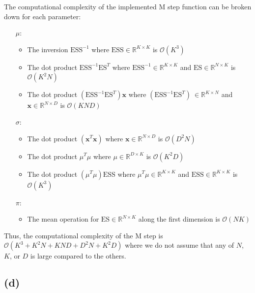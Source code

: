 \documentclass[12pt]{article}
\begin{document}
The computational complexity of the implemented M step function can be broken down for each parameter:

\begin{itemize}
\item [$\mu$:]\begin{itemize}
\item The inversion $\text{ESS}^{-1}$ where $\text{ESS} \in \mathbb{R}^{K \times K}$ is $\mathcal{O}(K^3)$
\item The dot product $\text{ESS}^{-1} \text{ES}^T$ where $\text{ESS}^{-1} \in \mathbb{R}^{K \times K}$ and $\text{ES} \in \mathbb{R}^{N \times K}$ is  $\mathcal{O}(K^2N)$
\item The dot product $(\text{ESS}^{-1} \text{ES}^T)\textbf{x}$ where $(\text{ESS}^{-1} \text{ES}^T)\ \in \mathbb{R}^{K \times N}$ and $\textbf{x} \in \mathbb{R}^{N \times D}$ is  $\mathcal{O}(KND )$
\end{itemize}

\item [$\sigma$:] \begin{itemize}
\item The dot product $(\textbf{x}^{T} \textbf{x})$ where $\textbf{x} \in \mathbb{R}^{N \times D}$ is  $\mathcal{O}(D^2N)$
\item The dot product $\mu^{T} \mu$ where $\mu \in \mathbb{R}^{D \times K}$ is  $\mathcal{O}(K^2D)$
\item The dot product $(\mu^{T} \mu)\text{ESS}$ where $\mu^{T} \mu \in \mathbb{R}^{K \times K}$ and $\text{ESS} \in \mathbb{R}^{K \times K}$ is $\mathcal{O}(K^3)$
\end{itemize}
\item [$\pi$:] \begin{itemize}
    \item The mean operation for $\text{ES} \in \mathbb{R}^{N \times K}$ along the first dimension is $\mathcal{O}(NK)$
    \end{itemize}
\end{itemize}

Thus, the computational complexity of the M step is $\mathcal{O}(K^3+K^2N + KND + D^2N + K^2D)$ where we do not assume that any of $N$, $K$, or $D$ is large compared to the others.
\newpage
\subsection*{(d)}
\end{document}
